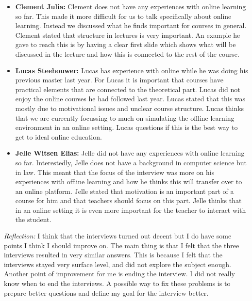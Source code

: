 \documentclass[]{article}
\begin{document}
\begin{itemize}
    \item[] \textbf{Clement Julia: }  
    Clement does not have any experiences with online learning so far. 
    This made it more difficult for us to talk specifically about online learning. 
    Instead we discussed what he finds important for courses in general. 
    Clement stated that structure in lectures is very important. 
    An example he gave to reach this is by having a clear first slide which shows 
    what will be discussed in the lecture and how this is connected to the rest of the course. 
    \item[] \textbf{Lucas Steehouwer: } 
    Lucas has experience with online while he was doing his previous master last year. 
    For Lucas it is important that courses have practical elements that are connected to the theoretical part. 
    Lucas did not enjoy the online courses he had followed last year. 
    Lucas stated that this was mostly due to motivational issues and unclear course structure. 
    Lucas thinks that we are currently focussing to much on simulating the offline learning 
    environment in an online setting. Lucas questions if this is the best way to get to ideal online education.
    \item[] \textbf{Jelle Witsen Elias: } 
    Jelle did not have any experiences with online learning so far. 
    Interestedly, Jelle does not have a background in computer science but in law.
    This meant that the focus of the interview was more on his experiences with
    offline learning and how he thinks this will transfer over to an online platform.
    Jelle stated that motivation is an important part of a course for him and 
    that teachers should focus on this part. Jelle thinks that in an online 
    setting it is even more important for the teacher to interact with the student. 
\end{itemize} 
\textit{Reflection:} I think that the interviews turned out decent but 
I do have some points I think I should improve on. The main thing is that I felt 
that the three interviews resulted in very similar answers. This is because I 
felt that the interviews stayed very surface level, and did not explore the 
subject enough. Another point of improvement for me is ending the interview.
I did not really know when to end the interviews. A possible way to fix these 
problems is to prepare better questions and define my goal for the interview better. 
\end{document}
